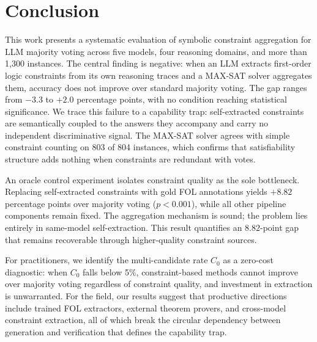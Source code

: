 \section{Conclusion}
\label{sec:conclusion}

This work presents a systematic evaluation of symbolic constraint aggregation for LLM majority voting across five models, four reasoning domains, and more than 1,300 instances. The central finding is negative: when an LLM extracts first-order logic constraints from its own reasoning traces and a MAX-SAT solver aggregates them, accuracy does not improve over standard majority voting. The gap ranges from $-3.3$ to $+2.0$ percentage points, with no condition reaching statistical significance. We trace this failure to a capability trap: self-extracted constraints are semantically coupled to the answers they accompany and carry no independent discriminative signal. The MAX-SAT solver agrees with simple constraint counting on 803 of 804 instances, which confirms that satisfiability structure adds nothing when constraints are redundant with votes.

An oracle control experiment isolates constraint quality as the sole bottleneck. Replacing self-extracted constraints with gold FOL annotations yields $+8.82$ percentage points over majority voting ($p < 0.001$), while all other pipeline components remain fixed. The aggregation mechanism is sound; the problem lies entirely in same-model self-extraction. This result quantifies an $8.82$-point gap that remains recoverable through higher-quality constraint sources.

For practitioners, we identify the multi-candidate rate $C_0$ as a zero-cost diagnostic: when $C_0$ falls below 5\%, constraint-based methods cannot improve over majority voting regardless of constraint quality, and investment in extraction is unwarranted. For the field, our results suggest that productive directions include trained FOL extractors, external theorem provers, and cross-model constraint extraction, all of which break the circular dependency between generation and verification that defines the capability trap.
